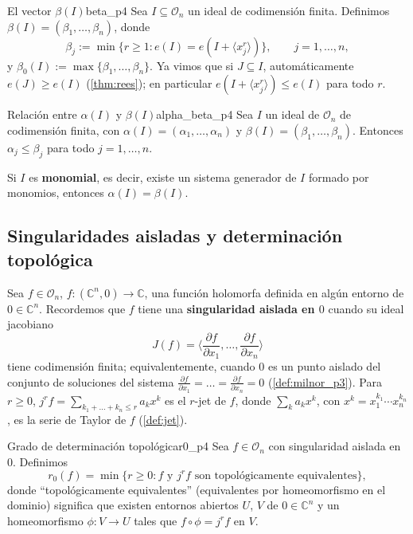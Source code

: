 \documentclass[11pt,a4paper]{article}
\begin{document}
\begin{definicion}{El vector $\beta(I)$}{beta_p4}
Sea $I \subseteq \mathcal{O}_n$ un ideal de codimensión finita. Definimos $\beta(I) = (\beta_1, \dots, \beta_n)$, donde
\[ \beta_j := \min\{ r \geq 1 : e(I) = e(I + \langle x_j^r \rangle) \}, \qquad j = 1, \dots, n, \]
y $\beta_0(I) := \max\{ \beta_1, \dots, \beta_n \}$. Ya vimos que si $J \subseteq I$, automáticamente $e(J) \geq e(I)$ (\cref{thm:rees}); en particular $e(I + \langle x_j^r \rangle) \leq e(I)$ para todo $r$.
\end{definicion}

\begin{teorema}{Relación entre $\alpha(I)$ y $\beta(I)$}{alpha_beta_p4}
Sea $I$ un ideal de $\mathcal{O}_n$ de codimensión finita, con $\alpha(I) = (\alpha_1, \dots, \alpha_n)$ y $\beta(I) = (\beta_1, \dots, \beta_n)$. Entonces $\alpha_j \leq \beta_j$ para todo $j = 1, \dots, n$.

Si $I$ es \textbf{monomial}, es decir, existe un sistema generador de $I$ formado por monomios, entonces $\alpha(I) = \beta(I)$.
\end{teorema}

\subsection*{Singularidades aisladas y determinación topológica}

Sea $f \in \mathcal{O}_n$, $f \colon (\mathbb{C}^n, 0) \to \mathbb{C}$, una función holomorfa definida en algún entorno de $0 \in \mathbb{C}^n$. Recordemos que $f$ tiene una \textbf{singularidad aislada en $0$} cuando su ideal jacobiano
\[ J(f) = \Big\langle \frac{\partial f}{\partial x_1}, \dots, \frac{\partial f}{\partial x_n} \Big\rangle \]
tiene codimensión finita; equivalentemente, cuando $0$ es un punto aislado del conjunto de soluciones del sistema $\frac{\partial f}{\partial x_1} = \dots = \frac{\partial f}{\partial x_n} = 0$ (\cref{def:milnor_p3}). Para $r \geq 0$, $j^r f = \sum_{k_1 + \dots + k_n \leq r} a_k x^k$ es el $r$-jet de $f$, donde $\sum_k a_k x^k$, con $x^k = x_1^{k_1} \cdots x_n^{k_n}$, es la serie de Taylor de $f$ (\cref{def:jet}).

\begin{definicion}{Grado de determinación topológica}{r0_p4}
Sea $f \in \mathcal{O}_n$ con singularidad aislada en $0$. Definimos
\[ r_0(f) = \min\{ r \geq 0 : f \text{ y } j^r f \text{ son topológicamente equivalentes} \}, \]
donde ``topológicamente equivalentes'' (equivalentes por homeomorfismo en el dominio) significa que existen entornos abiertos $U$, $V$ de $0 \in \mathbb{C}^n$ y un homeomorfismo $\phi \colon V \to U$ tales que $f \circ \phi = j^r f$ en $V$.
\end{definicion}
\end{document}

